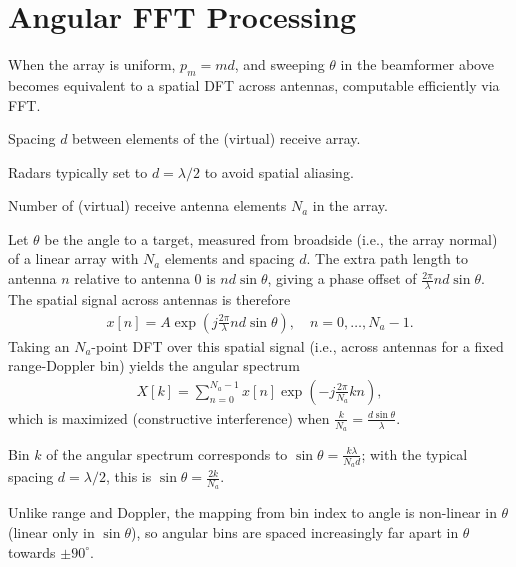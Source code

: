 \section{Angular FFT Processing}

When the array is uniform, $p_m = md$, and sweeping $\theta$ in the beamformer above becomes equivalent to a spatial DFT across antennas, computable efficiently via FFT.

\begin{definition}
Spacing $d$ between elements of the (virtual) receive array.
\end{definition}

\begin{remark}
Radars typically set to $d = \lambda/2$ to avoid spatial aliasing.
\end{remark}

\begin{definition}
Number of (virtual) receive antenna elements $N_a$ in the array.
\end{definition}

Let $\theta$ be the angle to a target, measured from broadside (i.e., the array normal) of a linear array with $N_a$ elements and spacing $d$. The extra path length to antenna $n$ relative to antenna $0$ is $nd\sin\theta$, giving a phase offset of $\frac{2\pi}{\lambda}nd\sin\theta$. The spatial signal across antennas is therefore
\begin{align*}
    x[n] = A\exp\left(j\frac{2\pi}{\lambda}nd\sin\theta\right), \quad n = 0, \dots, N_a - 1.
\end{align*}
Taking an $N_a$-point DFT over this spatial signal (i.e., across antennas for a fixed range-Doppler bin) yields the angular spectrum
\begin{align*}
    X[k] = \sum_{n=0}^{N_a - 1} x[n] \exp\left(-j\frac{2\pi}{N_a}kn\right),
\end{align*}
which is maximized (constructive interference) when $\frac{k}{N_a} = \frac{d\sin\theta}{\lambda}$.

\begin{definition}
Bin $k$ of the angular spectrum corresponds to $\sin\theta = \frac{k\lambda}{N_ad}$; with the typical spacing $d = \lambda/2$, this is $\sin\theta = \frac{2k}{N_a}$.
\end{definition}
\begin{remark}
Unlike range and Doppler, the mapping from bin index to angle is non-linear in $\theta$ (linear only in $\sin\theta$), so angular bins are spaced increasingly far apart in $\theta$ towards $\pm 90^\circ$.
\end{remark}


